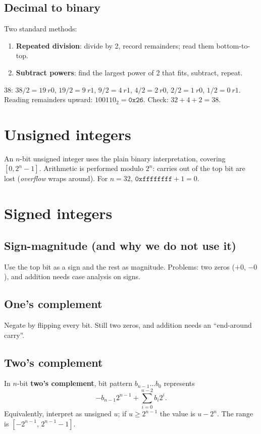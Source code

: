 \subsection{Decimal to binary}
Two standard methods:
\begin{enumerate}
  \item \textbf{Repeated division}: divide by 2, record remainders; read them bottom-to-top.
  \item \textbf{Subtract powers}: find the largest power of 2 that fits, subtract, repeat.
\end{enumerate}

\begin{example}
$38$: $38/2=19\ r0$, $19/2=9\ r1$, $9/2=4\ r1$, $4/2=2\ r0$, $2/2=1\ r0$, $1/2=0\ r1$.
Reading remainders upward: $100110_2 = \mathtt{0x26}$. Check: $32+4+2=38$.
\end{example}

\section{Unsigned integers}

An $n$-bit unsigned integer uses the plain binary interpretation, covering $[0, 2^n-1]$.
Arithmetic is performed modulo $2^n$: carries out of the top bit are lost (\emph{overflow}
wraps around). For $n=32$, $\mathtt{0xffffffff}+1 = 0$.

\section{Signed integers}

\subsection{Sign-magnitude (and why we do not use it)}
Use the top bit as a sign and the rest as magnitude. Problems: two zeros ($+0$, $-0$), and
addition needs case analysis on signs.

\subsection{One's complement}
Negate by flipping every bit. Still two zeros, and addition needs an ``end-around carry''.

\subsection{Two's complement}
\begin{definition}
In $n$-bit \textbf{two's complement}, bit pattern $b_{n-1}\dots b_0$ represents
\[
  -b_{n-1}2^{n-1} + \sum_{i=0}^{n-2} b_i 2^i.
\]
Equivalently, interpret as unsigned $u$; if $u \ge 2^{n-1}$ the value is $u - 2^n$.
The range is $[-2^{n-1},\, 2^{n-1}-1]$.
\end{definition}

